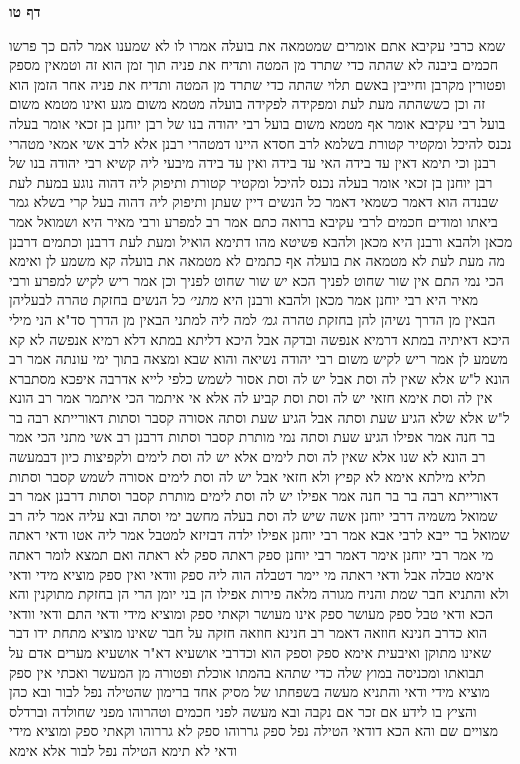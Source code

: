 \documentclass[12pt, openany]{book}
\newcommand{\sethebfont}{
\fontsize{10.5pt}{21.0pt} \selectfont
}
\newcommand{\twocol}[1]{
	{\sethebfont \begin{multicols}{2}
			#1
	\end{multicols}}	
}
\newcommand{\sectname}{}
\newcommand{\newsection}[1]{
	\addcontentsline{toc}{section}{#1}
	\renewcommand{\sectname}{#1}	
	\vspace{-\baselineskip}
	\begin{center}
		\textbf{%
\fontsize{16pt}{16pt}\selectfont
			#1}
	\end{center}
	\vspace{-\baselineskip}
	\nopagebreak
}
\begin{document}
\newsection{דף טו}
\twocol{שמא כרבי עקיבא אתם אומרים שמטמאה את בועלה אמרו לו לא שמענו 
אמר להם כך פרשו חכמים ביבנה לא שהתה כדי שתרד מן המטה ותדיח את פניה תוך זמן הוא זה וטמאין מספק ופטורין מקרבן וחייבין באשם תלוי 
שהתה כדי שתרד מן המטה ותדיח את פניה אחר הזמן הוא זה 
וכן כששהתה מעת לעת ומפקידה לפקידה בועלה מטמא משום מגע ואינו מטמא משום בועל רבי עקיבא אומר אף מטמא משום בועל רבי יהודה בנו של רבן יוחנן בן זכאי אומר בעלה נכנס להיכל ומקטיר קטורת 
בשלמא לרב חסדא היינו דמטהרי רבנן 
אלא לרב אשי אמאי מטהרי רבנן 
וכי תימא דאין עד בידה האי עד בידה ואין עד בידה מיבעי ליה קשיא
רבי יהודה בנו של רבן יוחנן בן זכאי אומר בעלה נכנס להיכל ומקטיר קטורת ותיפוק ליה דהוה נוגע במעת לעת שבנדה 
הוא דאמר כשמאי דאמר כל הנשים דיין שעתן 
ותיפוק ליה דהוה בעל קרי בשלא גמר ביאתו
ומודים חכמים לרבי עקיבא ברואה כתם אמר רב למפרע ורבי מאיר היא 
ושמואל אמר מכאן ולהבא ורבנן היא מכאן ולהבא פשיטא 
מהו דתימא הואיל ומעת לעת דרבנן וכתמים דרבנן מה מעת לעת לא מטמאה את בועלה אף כתמים לא מטמאה את בועלה קא משמע לן 
ואימא הכי נמי התם אין שור שחוט לפניך הכא יש שור שחוט לפניך 
וכן אמר ריש לקיש למפרע ורבי מאיר היא רבי יוחנן אמר מכאן ולהבא ורבנן היא
{\large\emph{מתני׳}} כל הנשים בחזקת טהרה לבעליהן הבאין מן הדרך נשיהן להן בחזקת טהרה
{\large\emph{גמ׳}} למה ליה למתני הבאין מן הדרך סד"א הני מילי היכא דאיתיה במתא דרמיא אנפשה ובדקה אבל היכא דליתא במתא דלא רמיא אנפשה לא קא משמע לן 
אמר ריש לקיש משום רבי יהודה נשיאה והוא שבא ומצאה בתוך ימי עונתה 
אמר רב הונא ל"ש אלא שאין לה וסת אבל יש לה וסת אסור לשמש 
כלפי לייא אדרבה איפכא מסתברא אין לה וסת אימא חזאי יש לה וסת וסת קביע לה 
אלא אי איתמר הכי איתמר אמר רב הונא ל"ש אלא שלא הגיע שעת וסתה אבל הגיע שעת וסתה אסורה קסבר וסתות דאורייתא 
רבה בר בר חנה אמר אפילו הגיע שעת וסתה נמי מותרת קסבר וסתות דרבנן 
רב אשי מתני הכי אמר רב הונא
לא שנו אלא שאין לה וסת לימים אלא יש לה וסת לימים ולקפיצות כיון דבמעשה תליא מילתא אימא לא קפיץ ולא חזאי אבל יש לה וסת לימים אסורה לשמש
קסבר וסתות דאורייתא 
רבה בר בר חנה אמר אפילו יש לה וסת לימים מותרת קסבר וסתות דרבנן 
אמר רב שמואל משמיה דרבי יוחנן אשה שיש לה וסת בעלה מחשב ימי וסתה ובא עליה 
אמר ליה רב שמואל בר ייבא לרבי אבא אמר רבי יוחנן אפילו ילדה דבזיזא למטבל 
אמר ליה אטו ודאי ראתה מי אמר רבי יוחנן אימר דאמר רבי יוחנן ספק ראתה ספק לא ראתה ואם תמצא לומר ראתה אימא טבלה
אבל ודאי ראתה מי יימר דטבלה הוה ליה ספק וודאי ואין ספק מוציא מידי ודאי 
ולא והתניא חבר שמת והניח מגורה מלאה פירות אפילו הן בני יומן הרי הן בחזקת מתוקנין והא הכא ודאי טבל ספק מעושר ספק אינו מעושר וקאתי ספק ומוציא מידי ודאי 
התם ודאי וודאי הוא כדרב חנינא חוזאה דאמר רב חנינא חוזאה חזקה על חבר שאינו מוציא מתחת ידו דבר שאינו מתוקן 
ואיבעית אימא ספק וספק הוא וכדרבי אושעיא דא"ר אושעיא מערים אדם על תבואתו ומכניסה במוץ שלה כדי שתהא בהמתו אוכלת ופטורה מן המעשר 
ואכתי אין ספק מוציא מידי ודאי והתניא מעשה בשפחתו של מסיק אחד ברימון שהטילה נפל לבור ובא כהן והציץ בו לידע אם זכר אם נקבה
ובא מעשה לפני חכמים וטהרוהו מפני שחולדה וברדלס מצויים שם 
והא הכא דודאי הטילה נפל ספק גררוהו ספק לא גררוהו וקאתי ספק ומוציא מידי ודאי 
לא תימא הטילה נפל לבור אלא אימא}
\end{document}
